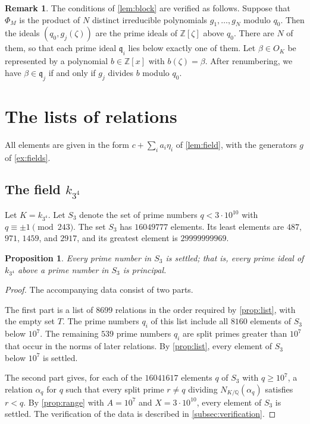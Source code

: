 \documentclass[11pt]{amsart}
\theoremstyle{plain}
\newtheorem{proposition}[theorem]{Proposition}
\theoremstyle{definition}
\newtheorem{remark}[theorem]{Remark}
\begin{document}
\begin{remark} \label{rem:blockcheck}
The conditions of \cref{lem:block} are verified as follows.
Suppose that $\Phi_M$ is the product of $N$ distinct irreducible polynomials $g_1, \ldots, g_N$ modulo $q_0$.
Then the ideals $(q_0, g_j(\zeta))$ are the prime ideals of $\mathbb{Z}[\zeta]$ above $q_0$.
There are $N$ of them, so that each prime ideal $\mathfrak{q}_i$ lies below exactly one of them.
Let $\beta \in O_K$ be represented by a polynomial $b \in \mathbb{Z}[x]$ with $b(\zeta) = \beta$.
After renumbering, we have $\beta \in \mathfrak{q}_j$ if and only if $g_j$ divides $b$ modulo $q_0$.
\end{remark}

\section{The lists of relations} \label{sec:data}

All elements are given in the form $c + \sum_i a_i \eta_i$ of \cref{lem:field}, with the generators $g$ of \cref{ex:fields}.

\subsection{The field $k_{3^4}$}

Let $K = k_{3^4}$.
Let $S_3$ denote the set of prime numbers $q < 3 \cdot 10^{10}$ with $q \equiv \pm 1 \pmod{243}$.
The set $S_3$ has $16049777$ elements.
Its least elements are $487$, $971$, $1459$, and $2917$, and its greatest element is $29999999969$.

\begin{proposition} \label{prop:data3}
Every prime number in $S_3$ is settled; that is, every prime ideal of $k_{3^4}$ above a prime number in $S_3$ is principal.
\end{proposition}

\begin{proof}
The accompanying data consist of two parts.

The first part is a list of $8699$ relations in the order required by \cref{prop:list}, with the empty set $T$.
The prime numbers $q_i$ of this list include all $8160$ elements of $S_3$ below $10^7$.
The remaining $539$ prime numbers $q_i$ are split primes greater than $10^7$ that occur in the norms of later relations.
By \cref{prop:list}, every element of $S_3$ below $10^7$ is settled.

The second part gives, for each of the $16041617$ elements $q$ of $S_3$ with $q \ge 10^7$, a relation $\alpha_q$ for $q$ such that every split prime $r \ne q$ dividing $N_{K/\mathbb{Q}}(\alpha_q)$ satisfies $r < q$.
By \cref{prop:range} with $A = 10^7$ and $X = 3 \cdot 10^{10}$, every element of $S_3$ is settled.
The verification of the data is described in \cref{subsec:verification}.
\end{proof}
\end{document}
